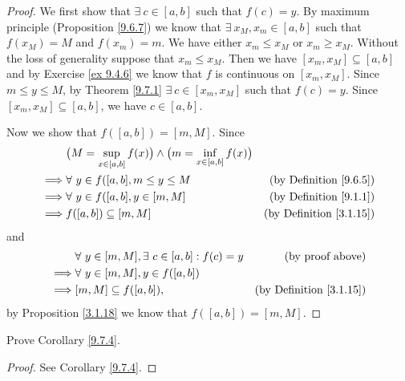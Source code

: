 \begin{proof}
    We first show that \(\exists\ c \in [a, b]\) such that \(f(c) = y\).
    By maximum principle (Proposition \ref{9.6.7}) we know that \(\exists\ x_M, x_m \in [a, b]\) such that \(f(x_M) = M\) and \(f(x_m) = m\).
    We have either \(x_m \leq x_M\) or \(x_m \geq x_M\).
    Without the loss of generality suppose that \(x_m \leq x_M\).
    Then we have \([x_m, x_M] \subseteq [a, b]\) and by Exercise \ref{ex 9.4.6} we know that \(f\) is continuous on \([x_m, x_M]\).
    Since \(m \leq y \leq M\), by Theorem \ref{9.7.1} \(\exists\ c \in [x_m, x_M]\) such that \(f(c) = y\).
    Since \([x_m, x_M] \subseteq [a, b]\), we have \(c \in [a, b]\).

    Now we show that \(f([a, b]) = [m, M]\).
    Since
    \begin{align*}
                 & \big(M = \sup_{x \in [a, b]} f(x)\big) \land \big(m = \inf_{x \in [a, b]} f(x)\big)                                       \\
        \implies & \forall\ y \in f([a, b], m \leq y \leq M                                            & \text{(by Definition \ref{9.6.5})}  \\
        \implies & \forall\ y \in f([a, b], y \in [m, M]                                               & \text{(by Definition \ref{9.1.1})}  \\
        \implies & f([a, b]) \subseteq [m, M]                                                          & \text{(by Definition \ref{3.1.15})}
    \end{align*}
    and
    \begin{align*}
                 & \forall\ y \in [m, M], \exists\ c \in [a, b] : f(c) = y & \text{(by proof above)}             \\
        \implies & \forall\ y \in [m, M], y \in f([a, b])                                                        \\
        \implies & [m, M] \subseteq f([a, b]),                             & \text{(by Definition \ref{3.1.15})}
    \end{align*}
    by Proposition \ref{3.1.18} we know that \(f([a, b]) = [m ,M]\).
\end{proof}

\exercisesection

\begin{exercise}\label{ex 9.7.1}
    Prove Corollary \ref{9.7.4}.
\end{exercise}

\begin{proof}
    See Corollary \ref{9.7.4}.
\end{proof}

